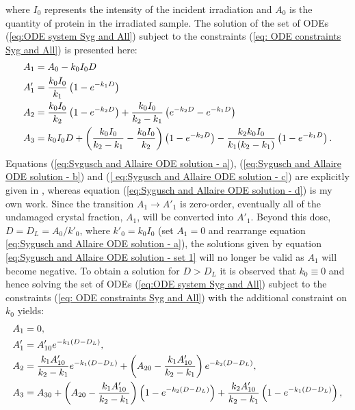 where $I_0$ represents the intensity of the incident irradiation and $A_0$ is the quantity of protein in the irradiated sample.
\newline
The solution of the set of ODEs (\ref{eq:ODE system Syg and All}) subject to the constraints (\ref{eq: ODE constraints Syg and All}) is presented here:
\begin{subequations}
\begin{align}
A_1  &= A_0 - k_0 I_0 D \label{eq:Sygusch and Allaire ODE solution - a}\\
A'_1 &= \frac{k_0 I_0}{k_1} \left( 1 - e^{-k_1 D}\right) \label{eq:Sygusch and Allaire ODE solution - b}\\
A_2  &= \frac{k_0 I_0}{k_2} \left( 1 - e^{-k_2 D}\right) + \frac{k_0 I_0}{k_2 - k_1} \left(e^{-k_2 D} - e^{-k_1 D}\right) \label{
eq:Sygusch and Allaire ODE solution - c}\\
A_3  &= k_0 I_0 D + \left(\frac{k_0 I_0}{k_2 - k_1} - \frac{k_0 I_0}{k_2}\right)\left( 1 - e^{-k_2 D}\right) - \frac{k_2 k_0 I_0}{k_1(k_2 - k_1)}\left(1 - e^{-k_1 D} \right) \label{eq:Sygusch and Allaire ODE solution - d}.
\end{align}
\label{eq:Sygusch and Allaire ODE solution - set 1}
\end{subequations}
Equations (\ref{eq:Sygusch and Allaire ODE solution - a}), (\ref{eq:Sygusch and Allaire ODE solution - b}) and (\ref{
eq:Sygusch and Allaire ODE solution - c}) are explicitly given in \cite{sygusch1988}, whereas equation (\ref{eq:Sygusch and Allaire ODE solution - d}) is my own work.
Since the transition $A_1 \rightarrow A'_1$ is zero-order, eventually all of the undamaged crystal fraction, $A_1$, will be converted into $A'_1$.
Beyond this dose, $D = D_L = A_0/k'_0$, where $k'_0 = k_0 I_0$ (set $A_1 = 0$ and rearrange equation \ref{eq:Sygusch and Allaire ODE solution - a}), the solutions given by equation \ref{eq:Sygusch and Allaire ODE solution - set 1} will no longer be valid as $A_1$ will become negative.
To obtain a solution for $D > D_L$ it is observed that $k_0 \equiv 0$ and hence solving the set of ODEs (\ref{eq:ODE system Syg and All}) subject to the constraints (\ref{eq: ODE constraints Syg and All}) with the additional constraint on $k_0$ yields:
\begin{subequations}
\begin{align}
A_1  &= 0, \\
A'_1 &= A'_{10} e^{-k_1 (D - D_L)}, \\
A_2  &= \frac{k_1 A'_{10}}{k_2 - k_1} e^{-k_1 (D - D_L)} + \left(A_{20} - \frac{k_1 A'_{10}}{k_2 - k_1} \right) e^{-k_2 (D - D_L)}, \\
A_3  &= A_{30} + \left(A_{20} - \frac{k_1 A'_{10}}{k_2 - k_1}\right) \left(1 - e^{-k_2(D-D_L)}\right) + \frac{k_2 A'_{10}}{k_2 - k_1} \left(1 - e^{-k_1 (D - D_L)}\right),
\end{align}
\label{eq:Sygusch and Allaire ODE solution - set 2}
\end{subequations}
